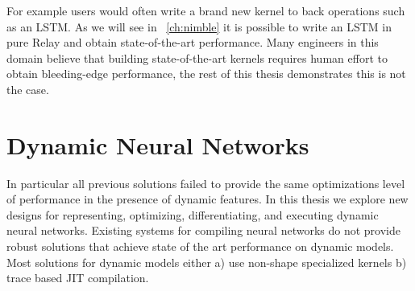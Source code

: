 For example users would often write a brand new kernel to back operations such
  as an LSTM.
As we will see in ~\ref{ch:nimble} it is possible to write an LSTM in pure Relay
  and obtain state-of-the-art performance.
Many engineers in this domain believe that building state-of-the-art kernels requires
  human effort to obtain bleeding-edge performance, the rest of this thesis demonstrates
  this is not the case.



\section{Dynamic Neural Networks}

In particular all previous solutions failed to provide the same optimizations
  level of performance in the presence of dynamic features.
In this thesis we explore new designs for representing,
  optimizing, differentiating, and executing dynamic neural networks.
Existing systems for compiling neural networks do not provide robust
   solutions that achieve state of the art performance on dynamic models.
Most solutions for dynamic models either
  a) use non-shape specialized kernels b) trace based JIT compilation.

